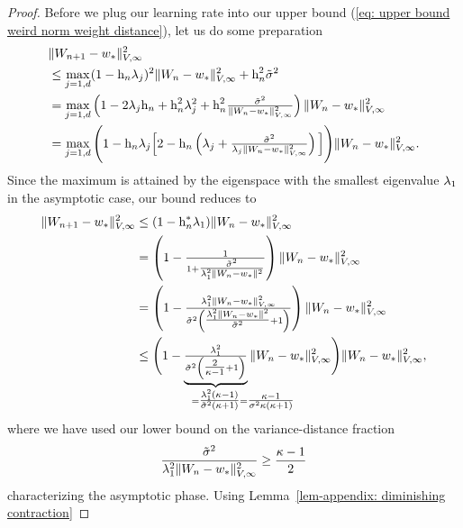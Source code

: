 \begin{proof}
	Before we plug our learning rate into our upper bound (\ref{eq: upper bound
	weird norm weight distance}), let us do some preparation 
	\begin{align}
		\nonumber
		&\|W_{n+1} -w_*\|_{V,\infty}^2\\
		\nonumber
		&\le \max_{j=1,d} (1-\text{h}_n\lambda_j)^2\|W_n -w_*\|_{V,\infty}^2
		+ \text{h}_n^2 \tilde{\sigma}^2\\
		\label{eq: upper bound useful for rate of convergence}
		&= \max_{j=1,d}\left(1- 2\lambda_j\text{h}_n + \text{h}_n^2\lambda_j^2
			+\text{h}_n^2\tfrac{\tilde{\sigma}^2}{\|W_n-w_*\|_{V,\infty}^2}
		\right)\|W_n-w_*\|_{V,\infty}^2\\
		\nonumber
		&= \max_{j=1,d}\Bigg(1- \text{h}_n \lambda_j\Big[2 - \text{h}_n \left(
			\lambda_j + \tfrac{\tilde{\sigma}^2}{\lambda_j\|W_n-w_*\|_{V,\infty}^2}
		\right)\Big] \Bigg)\|W_n-w_*\|_{V,\infty}^2.
	\end{align}
	Since the maximum is attained by the eigenspace with the smallest eigenvalue \(\lambda_1\)
	in the asymptotic case, our bound reduces to
	\begin{align*}
		\|\Weights_{n+1} -\minimum\|_{V,\infty}^2
		&\le (1- \lr_n^* \hesseEV_1)\|\Weights_n-\minimum\|_{V,\infty}^2\\
		&= \left(1- \tfrac{1}{1+ \tfrac{\tilde{\stdBound}^2}{\hesseEV_1^2\|\Weights_n-\minimum\|^2}}\right)
		\|\Weights_n-\minimum\|_{V,\infty}^2\\
		&= \left(1- \tfrac{
			\hesseEV_1^2 \|\Weights_n-\minimum\|_{V,\infty}^2
		}{
			\tilde{\stdBound}^2
			\left(\tfrac{\hesseEV_1^2\|\Weights_n-\minimum\|^2}{\tilde{\stdBound}^2}+1\right)
		}\right)
		\|\Weights_n-\minimum\|_{V,\infty}^2\\
		&\le \Bigg(
		1- \underbrace{\tfrac{
			\hesseEV_1^2
		}{
			\tilde{\stdBound}^2
			\left(\tfrac{2}{\condition -1}+1\right)
		}}_{
			=\tfrac{\hesseEV_1^2(\condition-1)}{\tilde{\stdBound}^2(\condition+1)}
			\mathrlap{=\tfrac{\condition-1}{\stdBound^2\condition(\condition+1)}}
		}
		\|\Weights_n-\minimum\|_{V,\infty}^2
		\Bigg)
		\|\Weights_n-\minimum\|_{V,\infty}^2,
	\end{align*}
	where we have used our lower bound on the variance-distance fraction
	\begin{align*}
		\frac{\tilde{\sigma}^2}{
			\lambda_1^2\|W_n-w_*\|_{V,\infty}^2
		}
		\ge \frac{\kappa-1}{2}
	\end{align*}
	characterizing the asymptotic phase. Using Lemma~\ref{lem-appendix: diminishing contraction}

\end{proof}
